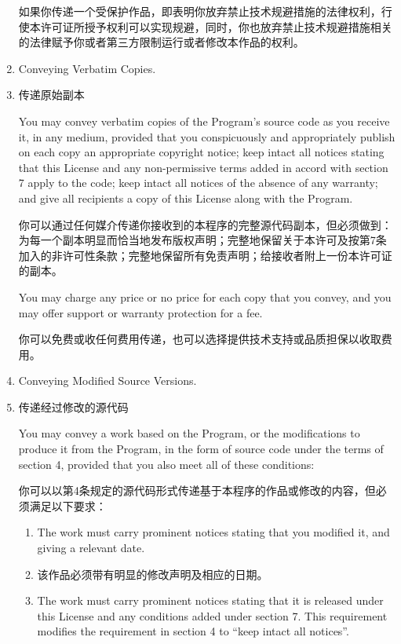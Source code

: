 \documentclass[11pt]{article}
\begin{document}
\begin{enumerate}
如果你传递一个受保护作品，即表明你放弃禁止技术规避措施的法律权利，行使本许可证所授予权利可以实现规避，同时，你也放弃禁止技术规避措施相关的法律赋予你或者第三方限制运行或者修改本作品的权利。

\item Conveying Verbatim Copies.
\item 传递原始副本

You may convey verbatim copies of the Program's source code as you
receive it, in any medium, provided that you conspicuously and
appropriately publish on each copy an appropriate copyright notice;
keep intact all notices stating that this License and any
non-permissive terms added in accord with section 7 apply to the code;
keep intact all notices of the absence of any warranty; and give all
recipients a copy of this License along with the Program.

你可以通过任何媒介传递你接收到的本程序的完整源代码副本，但必须做到：为每一个副本明显而恰当地发布版权声明；完整地保留关于本许可及按第7条加入的非许可性条款；完整地保留所有免责声明；给接收者附上一份本许可证的副本。

You may charge any price or no price for each copy that you convey,
and you may offer support or warranty protection for a fee.

你可以免费或收任何费用传递，也可以选择提供技术支持或品质担保以收取费用。

\item Conveying Modified Source Versions.
\item 传递经过修改的源代码

You may convey a work based on the Program, or the modifications to
produce it from the Program, in the form of source code under the
terms of section 4, provided that you also meet all of these conditions:

你可以以第4条规定的源代码形式传递基于本程序的作品或修改的内容，但必须满足以下要求：
  \begin{enumerate}
  \item The work must carry prominent notices stating that you modified
  it, and giving a relevant date.

  \item 该作品必须带有明显的修改声明及相应的日期。
  
  \item The work must carry prominent notices stating that it is
  released under this License and any conditions added under section
  7.  This requirement modifies the requirement in section 4 to
  ``keep intact all notices''.


\end{enumerate}
\end{enumerate}
\end{document}
